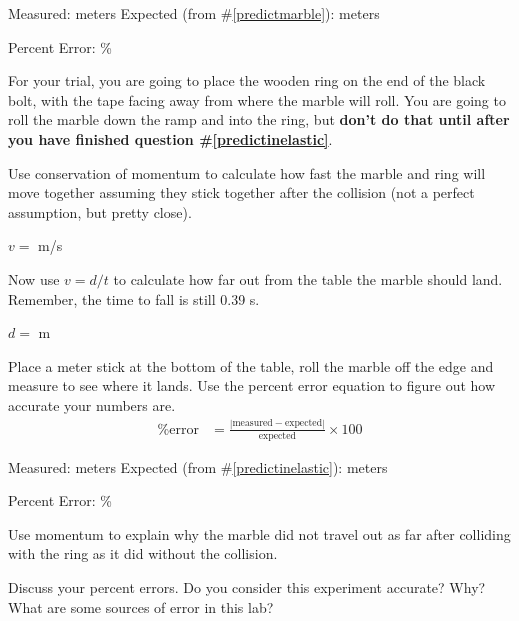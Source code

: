\documentclass[10pt]{exam}
\begin{document}
\begin{questions}
\begin{center}
  Measured: \fillin[][8em] meters
  \hspace{4em}
  Expected (from \#\ref{predictmarble}): \fillin[][8em]  meters
  \vspace{2em}
\end{center}


\begin{flushright}
  Percent Error: \fillin[][5em]\%
\end{flushright}

\pagebreak

\begin{EnvUplevel}
  For your trial, you are going to place the wooden ring on the end of the black bolt, with the tape facing away from where the marble will roll. You are going to roll the marble down the ramp and into the ring, but {\bf don't do that until after you have finished question \#\ref{predictinelastic}}.
\end{EnvUplevel}


\question
Use conservation of momentum to calculate how fast the marble and ring will move together assuming they stick together after the collision (not a perfect assumption, but pretty close).
\vs[3]

\begin{flushright}
  $v =$ \fillin[][8em] m/s
\end{flushright}


\question \label{predictinelastic}
Now use $v = d/t$ to calculate how far out from the table the marble should land. Remember, the time to fall is still 0.39 s.
\vs

\begin{flushright}
  $d =$ \fillin[][8em] m
\end{flushright}

\question
Place a meter stick at the bottom of the table, roll the marble off the edge and measure to see where it lands. Use the percent error equation to figure out how accurate your numbers are.
%
\begin{align*}
  \text{\% error} &=  
  \frac{
    \left|\text{measured}-\text{expected}\right|
    }{
      \text{expected}
    } 
  \times 100
\end{align*}

\begin{center}
  Measured: \fillin[][8em] meters
  \hspace{4em}
  Expected (from \#\ref{predictinelastic}): \fillin[][8em]  meters
  \vspace{2em}
\end{center}

\begin{flushright}
  Percent Error: \fillin[][5em] \%
\end{flushright}

\question
Use momentum to explain why the marble did not travel out as far after colliding with the ring as it did without the collision.
\vs

\question
Discuss your percent errors. Do you consider this experiment accurate? Why? What are some sources of error in this lab?
\vs


\end{questions}
\end{document}
